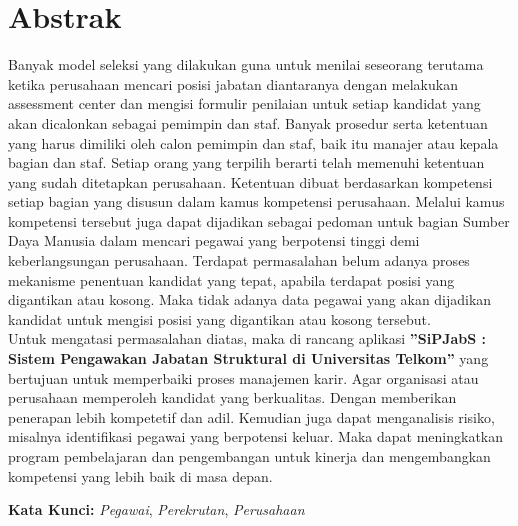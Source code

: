 
\chapter*{Abstrak}
\vspace*{0.7cm}

Banyak model seleksi yang dilakukan guna untuk menilai seseorang terutama ketika perusahaan mencari posisi jabatan diantaranya dengan melakukan assessment center dan mengisi formulir penilaian untuk setiap kandidat yang akan dicalonkan sebagai pemimpin dan staf. Banyak prosedur serta ketentuan yang harus dimiliki oleh calon pemimpin dan staf, baik itu manajer atau kepala bagian dan staf. Setiap orang yang terpilih berarti telah memenuhi ketentuan yang sudah ditetapkan perusahaan. Ketentuan dibuat berdasarkan kompetensi setiap bagian yang disusun dalam kamus kompetensi perusahaan. Melalui kamus kompetensi tersebut juga dapat dijadikan sebagai pedoman untuk bagian Sumber Daya Manusia dalam mencari pegawai yang berpotensi tinggi demi keberlangsungan perusahaan. Terdapat permasalahan belum adanya proses mekanisme penentuan kandidat yang tepat, apabila terdapat posisi yang digantikan atau kosong. Maka tidak adanya data pegawai yang akan dijadikan kandidat untuk mengisi posisi yang digantikan atau kosong tersebut.
\\

Untuk mengatasi permasalahan diatas, maka di rancang aplikasi \textbf{”SiPJabS : Sistem Pengawakan Jabatan Struktural di Universitas Telkom”} yang bertujuan untuk memperbaiki proses manajemen karir. Agar organisasi atau perusahaan memperoleh kandidat yang berkualitas. Dengan memberikan penerapan lebih kompetetif dan adil. Kemudian juga dapat menganalisis risiko, misalnya identifikasi pegawai yang berpotensi keluar. Maka dapat meningkatkan program pembelajaran dan pengembangan untuk kinerja dan mengembangkan kompetensi yang lebih baik di masa depan. 

\vspace*{0.2cm}

\noindent \textbf{Kata Kunci:} \textit{Pegawai}, \textit{Perekrutan}, \textit{Perusahaan}\\ 

\newpage